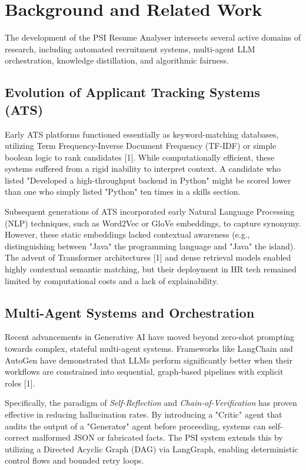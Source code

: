 \documentclass[10pt,journal,compsoc]{IEEEtran}
\begin{document}
\section{Background and Related Work}\label{sec:background}

The development of the PSI Resume Analyser intersects several active domains of research, including automated recruitment systems, multi-agent LLM orchestration, knowledge distillation, and algorithmic fairness.

\subsection{Evolution of Applicant Tracking Systems (ATS)}
Early ATS platforms functioned essentially as keyword-matching databases, utilizing Term Frequency-Inverse Document Frequency (TF-IDF) or simple boolean logic to rank candidates [1]. While computationally efficient, these systems suffered from a rigid inability to interpret context. A candidate who listed "Developed a high-throughput backend in Python" might be scored lower than one who simply listed "Python" ten times in a skills section.

Subsequent generations of ATS incorporated early Natural Language Processing (NLP) techniques, such as Word2Vec or GloVe embeddings, to capture synonymy. However, these static embeddings lacked contextual awareness (e.g., distinguishing between "Java" the programming language and "Java" the island). The advent of Transformer architectures [1] and dense retrieval models enabled highly contextual semantic matching, but their deployment in HR tech remained limited by computational costs and a lack of explainability.

\subsection{Multi-Agent Systems and Orchestration}
Recent advancements in Generative AI have moved beyond zero-shot prompting towards complex, stateful multi-agent systems. Frameworks like LangChain and AutoGen have demonstrated that LLMs perform significantly better when their workflows are constrained into sequential, graph-based pipelines with explicit roles [1]. 

Specifically, the paradigm of \textit{Self-Reflection} and \textit{Chain-of-Verification} has proven effective in reducing hallucination rates. By introducing a "Critic" agent that audits the output of a "Generator" agent before proceeding, systems can self-correct malformed JSON or fabricated facts. The PSI system extends this by utilizing a Directed Acyclic Graph (DAG) via LangGraph, enabling deterministic control flows and bounded retry loops.
\end{document}

